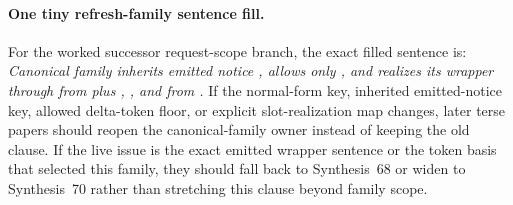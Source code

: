 \documentclass[11pt]{article}
\begin{document}
\paragraph{One tiny refresh-family sentence fill.}
For the worked successor request-scope branch, the exact filled sentence is: \emph{Canonical family  inherits emitted notice , allows only , and realizes its wrapper through  from  plus , , and  from .} If the normal-form key, inherited emitted-notice key, allowed delta-token floor, or explicit slot-realization map changes, later terse papers should reopen the canonical-family owner instead of keeping the old clause. If the live issue is the exact emitted wrapper sentence or the token basis that selected this family, they should fall back to Synthesis~68 or widen to Synthesis~70 rather than stretching this clause beyond family scope.\cite{series:workedexample}

\clearpage
\end{document}
